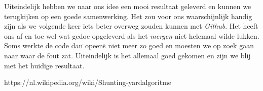 \documentclass[12pt]{article}
\begin{document}
Uiteindelijk hebben we naar ons idee een mooi resultaat geleverd en kunnen we terugkijken op een goede samenwerking. Het zou voor ons waarschijnlijk handig zijn als we volgende keer iets beter overweg zouden kunnen met \textit{Github}. Het heeft ons af en toe wel wat gedoe opgeleverd als het \textit{mergen} niet helemaal wilde lukken. Soms werkte de code dan \"{}opeens\"{} niet meer zo goed en moesten we op zoek gaan naar waar de fout zat. Uiteindelijk is het allemaal goed gekomen en zijn we blij met het huidige resultaat.



\begin{thebibliography}{9}
https://nl.wikipedia.org/wiki/Shunting-yardalgoritme
\end{thebibliography}
\end{document}

